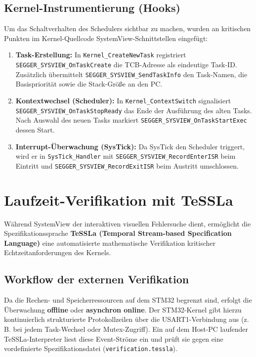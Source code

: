 \subsection{Kernel-Instrumentierung (Hooks)}
Um das Schaltverhalten des Schedulers sichtbar zu machen, wurden an kritischen Punkten im Kernel-Quellcode SystemView-Schnittstellen eingefügt:
\begin{enumerate}
    \item \textbf{Task-Erstellung:} In \lstinline|Kernel_CreateNewTask| registriert \lstinline|SEGGER_SYSVIEW_OnTaskCreate| die TCB-Adresse als eindeutige Task-ID. Zusätzlich übermittelt \lstinline|SEGGER_SYSVIEW_SendTaskInfo| den Task-Namen, die Basispriorität sowie die Stack-Größe an den PC.
    \item \textbf{Kontextwechsel (Scheduler):} In \lstinline|Kernel_ContextSwitch| signalisiert \lstinline|SEGGER_SYSVIEW_OnTaskStopReady| das Ende der Ausführung des alten Tasks. Nach Auswahl des neuen Tasks markiert \lstinline|SEGGER_SYSVIEW_OnTaskStartExec| dessen Start.
    \item \textbf{Interrupt-Überwachung (SysTick):} Da SysTick den Scheduler triggert, wird er in \lstinline|SysTick_Handler| mit \lstinline|SEGGER_SYSVIEW_RecordEnterISR| beim Eintritt und \lstinline|SEGGER_SYSVIEW_RecordExitISR| beim Austritt umschlossen.
\end{enumerate}

\section{Laufzeit-Verifikation mit TeSSLa}
Während SystemView der interaktiven visuellen Fehlersuche dient, ermöglicht die Spezifikationssprache \textbf{TeSSLa (Temporal Stream-based Specification Language)} eine automatisierte mathematische Verifikation kritischer Echtzeitanforderungen des Kernels.

\subsection{Workflow der externen Verifikation}
Da die Rechen- und Speicherressourcen auf dem STM32 begrenzt sind, erfolgt die Überwachung \textbf{offline} oder \textbf{asynchron online}. Der STM32-Kernel gibt hierzu kontinuierlich strukturierte Protokollzeilen über die USART1-Verbindung aus (z. B. bei jedem Task-Wechsel oder Mutex-Zugriff). Ein auf dem Host-PC laufender TeSSLa-Interpreter liest diese Event-Ströme ein und prüft sie gegen eine vordefinierte Spezifikationsdatei (\lstinline|verification.tessla|).

